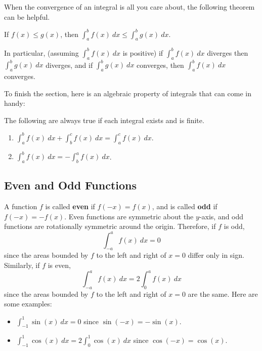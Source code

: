 When the convergence of an integral is all you care about, the following theorem can be helpful.

\begin{theorem}
If $f(x) \leq g(x)$, then $\int_a^b f(x)\ dx \leq \int_a^b g(x)\ dx$.
\end{theorem}
In particular, (assuming $\int_a^b f(x)\ dx$ is positive) if  $\int_a^b f(x)\ dx$ diverges then $\int_a^b g(x)\ dx$ diverges, and if $\int_a^b g(x)\ dx$ converges, then $\int_a^b f(x)\ dx$ converges.

\vspace{1em}

To finish the section, here is an algebraic property of integrals that can come in handy:
\begin{theorem} The following are always true if each integral exists and is finite.
\begin{enumerate}
\item $\displaystyle\int_a^bf(x)\ dx + \int_b^cf(x)\ dx = \int_a^c f(x)\ dx$.
\item $\displaystyle\int_a^bf(x)\ dx = -\int_b^a f(x)\ dx$.
\end{enumerate}
\end{theorem}


\subsection{Even and Odd Functions}

A function $f$ is called \textbf{even} if $f(-x)=f(x)$, and is called \textbf{odd} if $f(-x)=-f(x)$. Even functions are symmetric about the $y$-axis, and odd functions are rotationally symmetric around the origin. Therefore, if $f$ is odd,
$$\int_{-a}^af(x)\ dx = 0$$
since the areas bounded by $f$ to the left and right of $x=0$ differ only in sign. Similarly, if $f$ is even,
$$\int_{-a}^af(x)\ dx = 2\int_{0}^af(x)\ dx$$
since the areas bounded by $f$ to the left and right of $x=0$ are the same.
Here are some examples:
\begin{itemize}
\item $\int_{-1}^1\sin(x)\ dx = 0$ since $\sin(-x)=-\sin(x)$.
\item $\int_{-1}^1\cos(x)\ dx = 2\int_0^1\cos(x)\ dx$ since $\cos(-x)=\cos(x)$.
\end{itemize}




